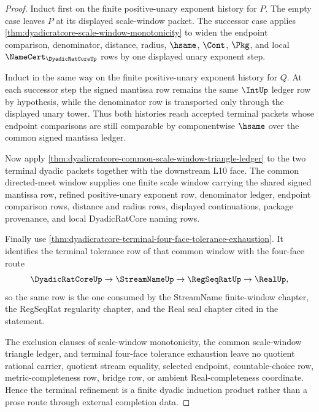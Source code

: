 \begin{proof}
Induct first on the finite positive-unary exponent history for $P$. The empty case leaves $P$ at its displayed scale-window packet. The successor case applies \autoref{thm:dyadicratcore-scale-window-monotonicity} to widen the endpoint comparison, denominator, distance, radius, $\hsame$, $\Cont$, $\Pkg$, and local $\NameCert_{\DyadicRatCoreUp}$ rows by one displayed unary exponent step.

Induct in the same way on the finite positive-unary exponent history for $Q$. At each successor step the signed mantissa row remains the same $\IntUp$ ledger row by hypothesis, while the denominator row is transported only through the displayed unary tower. Thus both histories reach accepted terminal packets whose endpoint comparisons are still comparable by componentwise $\hsame$ over the common signed mantissa ledger.

Now apply \autoref{thm:dyadicratcore-common-scale-window-triangle-ledger} to the two terminal dyadic packets together with the downstream L10 face. The common directed-meet window supplies one finite scale window carrying the shared signed mantissa row, refined positive-unary exponent row, denominator ledger, endpoint comparison rows, distance and radius rows, displayed continuations, package provenance, and local DyadicRatCore naming rows.

Finally use \autoref{thm:dyadicratcore-terminal-four-face-tolerance-exhaustion}. It identifies the terminal tolerance row of that common window with the four-face route
$$
\DyadicRatCoreUp \to \StreamNameUp \to \RegSeqRatUp \to \RealUp ,
$$
so the same row is the one consumed by the StreamName finite-window chapter, the RegSeqRat regularity chapter, and the Real seal chapter cited in the statement.

The exclusion clauses of scale-window monotonicity, the common scale-window triangle ledger, and terminal four-face tolerance exhaustion leave no quotient rational carrier, quotient stream equality, selected endpoint, countable-choice row, metric-completeness row, bridge row, or ambient Real-completeness coordinate. Hence the terminal refinement is a finite dyadic induction product rather than a prose route through external completion data.
\end{proof}

